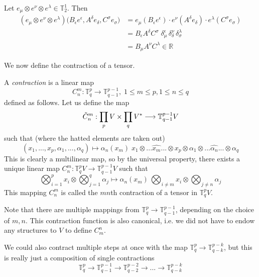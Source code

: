 \documentclass{article}
\begin{document}
    \begin{example}
    Let $e_{\mu} \otimes e^{\nu} \otimes e^{\lambda} \in \mathbb{T}^{1}_{2}$. Then 
    \begin{align*}
    (e_{\mu} \otimes e^{\nu} \otimes e^{\lambda}) \big( B_{\epsilon} e ^{\epsilon}, A^{\delta} e_{\delta}, C^{\sigma} e_{\sigma} \big) & = e_{\mu} (B_{\epsilon} e^{\epsilon}) \cdot e^{\nu} (A^{\delta} e_{\delta}) \cdot e^{\lambda} (C^\sigma e_{\sigma}) \\
     & = B_{\epsilon} A^{\delta} C^{\sigma} \; \delta_{\mu}^{\epsilon} \, \delta_{\delta}^{\nu} \, \delta_{\sigma}^{\lambda} \\
     & = B_{\mu} A^{\nu} C^{\lambda} \in \mathbb{R} 
     \end{align*}
    \end{example}

    We now define the contraction of a tensor. 

    \begin{definition}
    A \textit{contraction} is a linear map
    \[C^m_n: \mathbb{T}^p_q \longrightarrow \mathbb{T}^{p-1}_{q-1}, \; 1 \leq m \leq p, 1 \leq n \leq q\]
    defined as follows. Let us define the map 
    \[\Tilde{C}^m_n: \prod_{p} V \times \prod_q V^* \longrightarrow \mathbb{T}^{p-1}_{q-1} V\]
    such that (where the hatted elements are taken out)
    \[ (x_1, ..., x_p, \alpha_1, ..., \alpha_q) \mapsto \alpha_n (x_m) \; x_1 \otimes ... \hat{x_m} ... \otimes x_p \otimes \alpha_1 \otimes ... \hat{\alpha_n} ... \otimes \alpha_q\]
    This is clearly a multilinear map, so by the universal property, there exists a unique linear map $C^m_n: \mathbb{T}^p_q V \longrightarrow \mathbb{T}^{p-1}_{q-1} V$ such that 
    \[ \bigotimes_{i=1}^p x_i \otimes \bigotimes_{j=1}^q \alpha_j \mapsto \alpha_n (x_m) \, \bigotimes_{i \neq m} x_i \otimes \bigotimes_{j \neq n} \alpha_j\]
    This mapping $C^m_n$ is called the $m n$th contraction of a tensor in $\mathbb{T}^p_q V$. 
    \end{definition}

    Note that there are multiple mappings from $\mathbb{T}^p_q \longrightarrow \mathbb{T}^{p-1}_{q-1}$, depending on the choice of $m, n$. This contraction function is also canonical, i.e. we did not have to endow any structures to $V$ to define $C^n_m$. 

    We could also contract multiple steps at once with the map $\mathbb{T}^p_q \longrightarrow \mathbb{T}^{p-k}_{q-k}$, but this is really just a composition of single contractions 
    \[\mathbb{T}^p_q \longrightarrow \mathbb{T}^{p-1}_{q-1} \longrightarrow \mathbb{T}^{p-2}_{q-2} \longrightarrow ... \longrightarrow \mathbb{T}^{p-k}_{q-k} \]
\end{document}
